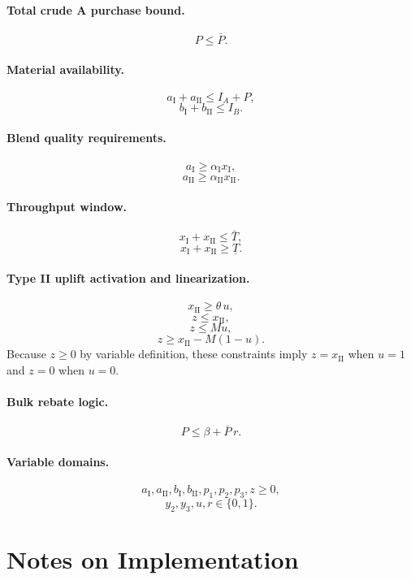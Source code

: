 \paragraph{Total crude A purchase bound.}
\[
P \le \bar P.
\]

\paragraph{Material availability.}
\[
a_{\mathrm{I}} + a_{\mathrm{II}} \le I_A + P,
\]
\[
b_{\mathrm{I}} + b_{\mathrm{II}} \le I_B.
\]

\paragraph{Blend quality requirements.}
\[
a_{\mathrm{I}} \ge \alpha_{\mathrm{I}} x_{\mathrm{I}},
\]
\[
a_{\mathrm{II}} \ge \alpha_{\mathrm{II}} x_{\mathrm{II}}.
\]

\paragraph{Throughput window.}
\[
x_{\mathrm{I}} + x_{\mathrm{II}} \le \bar T,
\]
\[
x_{\mathrm{I}} + x_{\mathrm{II}} \ge \underline T.
\]

\paragraph{Type II uplift activation and linearization.}
\[
x_{\mathrm{II}} \ge \theta\, u,
\]
\[
z \le x_{\mathrm{II}},
\]
\[
z \le M u,
\]
\[
z \ge x_{\mathrm{II}} - M(1-u).
\]
Because $z \ge 0$ by variable definition, these constraints imply $z=x_{\mathrm{II}}$ when $u=1$ and $z=0$ when $u=0$.

\paragraph{Bulk rebate logic.}
\[
P \le \beta + \bar P\, r.
\]

\paragraph{Variable domains.}
\[
a_{\mathrm{I}},a_{\mathrm{II}},b_{\mathrm{I}},b_{\mathrm{II}},p_1,p_2,p_3,z \ge 0,
\]
\[
y_2,y_3,u,r \in \{0,1\}.
\]

\section*{Notes on Implementation}

